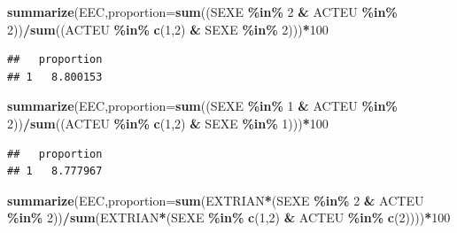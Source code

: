 \documentclass[
]{book}
\newenvironment{Shaded}{\begin{snugshade}}{\end{snugshade}}
\newcommand{\AttributeTok}[1]{\textcolor[rgb]{0.13,0.29,0.53}{#1}}
\newcommand{\DecValTok}[1]{\textcolor[rgb]{0.00,0.00,0.81}{#1}}
\newcommand{\FunctionTok}[1]{\textcolor[rgb]{0.13,0.29,0.53}{\textbf{#1}}}
\newcommand{\NormalTok}[1]{#1}
\newcommand{\SpecialCharTok}[1]{\textcolor[rgb]{0.81,0.36,0.00}{\textbf{#1}}}
\begin{document}
\begin{Shaded}
\begin{Highlighting}[]
\FunctionTok{summarize}\NormalTok{(EEC,}\AttributeTok{proportion=}\FunctionTok{sum}\NormalTok{((SEXE }\SpecialCharTok{\%in\%} \DecValTok{2} \SpecialCharTok{\&}\NormalTok{ ACTEU }\SpecialCharTok{\%in\%} \DecValTok{2}\NormalTok{))}\SpecialCharTok{/}\FunctionTok{sum}\NormalTok{((ACTEU }\SpecialCharTok{\%in\%} \FunctionTok{c}\NormalTok{(}\DecValTok{1}\NormalTok{,}\DecValTok{2}\NormalTok{) }\SpecialCharTok{\&}\NormalTok{ SEXE }\SpecialCharTok{\%in\%} \DecValTok{2}\NormalTok{)))}\SpecialCharTok{*}\DecValTok{100}
\end{Highlighting}
\end{Shaded}

\begin{verbatim}
##   proportion
## 1   8.800153
\end{verbatim}

\begin{Shaded}
\begin{Highlighting}[]
\FunctionTok{summarize}\NormalTok{(EEC,}\AttributeTok{proportion=}\FunctionTok{sum}\NormalTok{((SEXE }\SpecialCharTok{\%in\%} \DecValTok{1} \SpecialCharTok{\&}\NormalTok{ ACTEU }\SpecialCharTok{\%in\%} \DecValTok{2}\NormalTok{))}\SpecialCharTok{/}\FunctionTok{sum}\NormalTok{((ACTEU }\SpecialCharTok{\%in\%} \FunctionTok{c}\NormalTok{(}\DecValTok{1}\NormalTok{,}\DecValTok{2}\NormalTok{) }\SpecialCharTok{\&}\NormalTok{ SEXE }\SpecialCharTok{\%in\%} \DecValTok{1}\NormalTok{)))}\SpecialCharTok{*}\DecValTok{100}
\end{Highlighting}
\end{Shaded}

\begin{verbatim}
##   proportion
## 1   8.777967
\end{verbatim}

\begin{Shaded}
\begin{Highlighting}[]
\FunctionTok{summarize}\NormalTok{(EEC,}\AttributeTok{proportion=}\FunctionTok{sum}\NormalTok{(EXTRIAN}\SpecialCharTok{*}\NormalTok{(SEXE }\SpecialCharTok{\%in\%} \DecValTok{2} \SpecialCharTok{\&}\NormalTok{ ACTEU }\SpecialCharTok{\%in\%} \DecValTok{2}\NormalTok{))}\SpecialCharTok{/}\FunctionTok{sum}\NormalTok{(EXTRIAN}\SpecialCharTok{*}\NormalTok{(SEXE }\SpecialCharTok{\%in\%} \FunctionTok{c}\NormalTok{(}\DecValTok{1}\NormalTok{,}\DecValTok{2}\NormalTok{) }\SpecialCharTok{\&}\NormalTok{ ACTEU }\SpecialCharTok{\%in\%} \FunctionTok{c}\NormalTok{(}\DecValTok{2}\NormalTok{))))}\SpecialCharTok{*}\DecValTok{100}
\end{Highlighting}
\end{Shaded}
\end{document}
